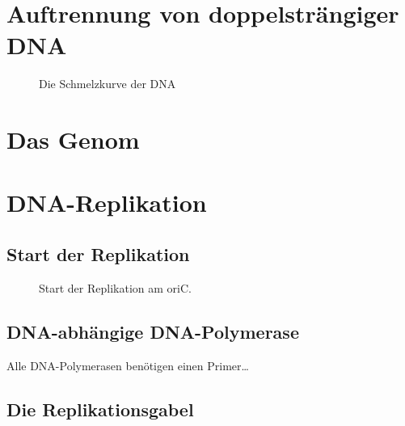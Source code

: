 
\section{Auftrennung von doppelsträngiger DNA}\label{sec:auftrennung-von-doppelstrangiger-dna}

\begin{figure}[H]
    \caption{Die Schmelzkurve der DNA}\label{fig:figure}
\end{figure}


\section{Das Genom}\label{sec:das-genom}





\section{DNA-Replikation}\label{sec:dna-replikation}



\subsection{Start der Replikation}\label{subsec:start-der-replikation}

\begin{figure}[H]
    \caption{Start der Replikation am oriC.}\label{fig:figure2}
\end{figure}

\subsection{DNA-abhängige DNA-Polymerase}\label{subsec:dna-abhangige-dna-polymerase}

Alle DNA-Polymerasen benötigen einen Primer\ldots

\subsection{Die Replikationsgabel}\label{subsec:die-replikationsgabel}

